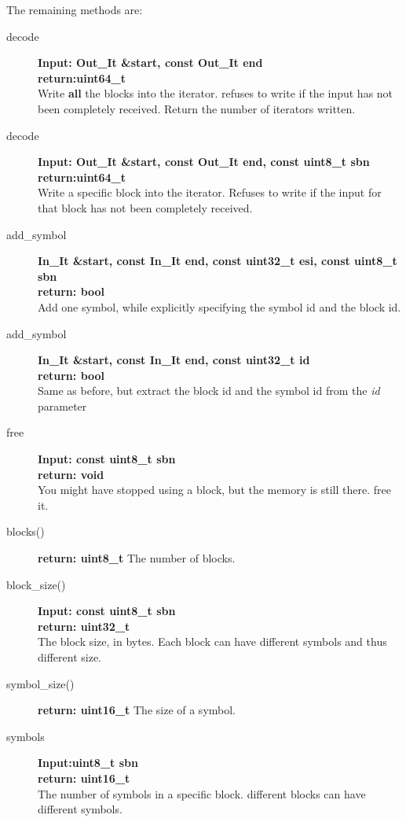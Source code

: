 \documentclass[11pt,a4paper]{refart}
\begin{document}
The remaining methods are:
\begin{description}
\item[decode]\textbf{Input: Out\_It \&start, const Out\_It end}\\
\textbf{return:uint64\_t}\\
Write \textbf{all} the blocks into the iterator. refuses to write if the input has not been completely received. Return the number of iterators written.

\item[decode]\textbf{Input: Out\_It \&start, const Out\_It end, const uint8\_t sbn}\\
\textbf{return:uint64\_t}\\
Write a specific block into the iterator. Refuses to write if the input for that block has not been completely received.

\item[add\_symbol]\textbf{In\_It \&start, const In\_It end, const uint32\_t esi, const uint8\_t sbn}\\
\textbf{return: bool}\\
Add one symbol, while explicitly specifying the symbol id and the block id.

\item[add\_symbol]\textbf{In\_It \&start, const In\_It end, const uint32\_t id}\\
\textbf{return: bool}\\
Same as before, but extract the block id and the symbol id from the \textit{id} parameter

\item[free]\textbf{Input: const uint8\_t sbn}\\
\textbf{return: void}\\
You might have stopped using a block, but the memory is still there. free it.

\item[blocks()] \textbf{return: uint8\_t} The number of blocks.

\item[block\_size()] \textbf{Input: const uint8\_t sbn}\\
\textbf{return: uint32\_t}\\
The block size, in bytes. Each block can have different symbols and thus different size.

\item[symbol\_size()] \textbf{return: uint16\_t} The size of a symbol.

\item[symbols] \textbf{Input:uint8\_t sbn}\\
\textbf{return: uint16\_t}\\
The number of symbols in a specific block. different blocks can have different symbols.
\end{description}
\newpage
\end{document}

